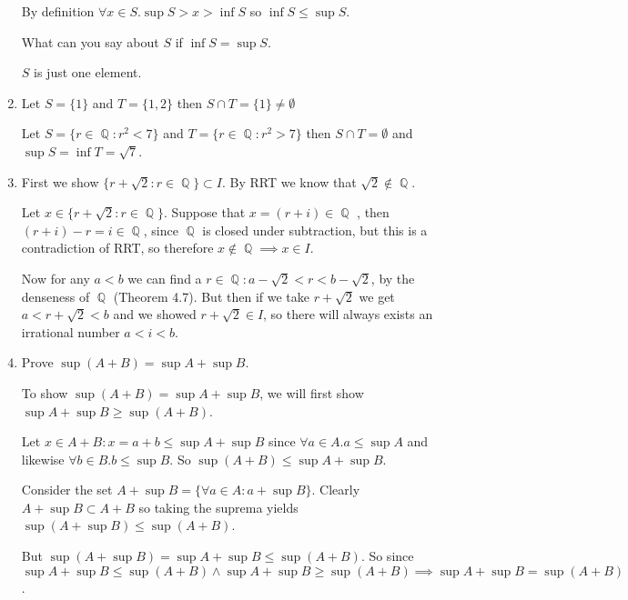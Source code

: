 \documentclass[10pt,a4paper]{article}
\DeclareMathOperator*{\Q}{\mathbb{Q}}
\begin{document}
\begin{enumerate}
        By definition $\forall x \in S. \sup S > x > \inf S$ so $\inf S \leq \sup S$.

        What can you say about $S$ if $\inf S = \sup S$.
        
        $S$ is just one element.

    \item Let $S = \{ 1 \} $ and $T = \{1, 2\}$ then $S \cap T = \{ 1 \} \neq \emptyset$

        Let $S = \{ r \in \Q : r^2 < 7 \} $ and $T = \{ r \in \Q : r^2 > 7 \}$ then $S \cap T = \emptyset$ and $\sup S = \inf T = \sqrt7$.

    \item First we show $\{ r + \sqrt2 : r \in \Q\} \subset I$. By RRT we know that $\sqrt2 \not\in \Q$.

        Let $x \in \{ r + \sqrt2 : r \in \Q\}$. Suppose that $x = (r+i) \in \Q$ , then $(r+i) - r = i \in \Q$, since $\Q$ is closed under subtraction, but this is a contradiction of RRT, so therefore $x \not\in \Q \implies x \in I$.

        Now for any $a < b$ we can find a $r \in \Q : a - \sqrt2 < r < b - \sqrt2$, by the denseness of $\Q$ (Theorem 4.7). 
        But then if we take $r + \sqrt2$ we get $a < r+\sqrt2 < b$ and we showed $r+\sqrt2 \in I$, so there will always exists an irrational number $a < i < b$.

    \item Prove $\sup(A+B) = \sup A + \sup B $.

        To show $\sup(A+B) = \sup A + \sup B $, we will first show $\sup A + \sup B \geq\sup(A+B)$.

        Let $x \in A+B : x =a+b  \leq \sup A  + \sup B$ since $\forall a \in A. a \leq \sup A$ and likewise $\forall b \in B. b \leq \sup B$.  So $\sup (A+B) \leq \sup A +  \sup B$.

        Consider the set $A+\sup B = \{\forall a \in A: a+\sup B\}$. Clearly $A + \sup B \subset A+B $ so taking the suprema yields $\sup(A+\sup B)\leq \sup(A+B)$. 

        But $\sup(A + \sup B) = \sup A + \sup B \leq \sup(A+B)$. So since 
        $$\sup A + \sup B \leq \sup(A+B) \land \sup A + \sup B \geq \sup(A+B) \implies \sup A + \sup B = \sup(A+B)$$.



\end{enumerate}
\end{document}
